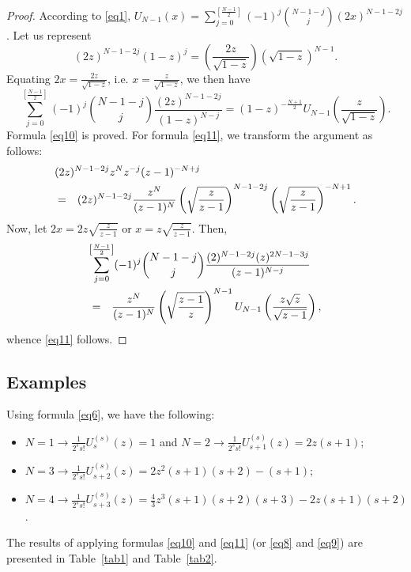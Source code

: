 \documentclass{article}
\begin{document}
\begin{proof}
According to \eqref{eq1}, $\displaystyle U_{N-1}(x) = \sum_{j = 0}^{\left[\frac{N-1}{2}\right]}(-1)^j{N-1-j \choose j}(2x)^{N-1-2j}$. Let us represent
$$
(2z)^{N-1-2j}(1-z)^j = \left(\frac{2z}{\sqrt{1-z}}\right)(\sqrt{1-z})^{N-1}.
$$
Equating $2x = \frac{2z}{\sqrt{1-z}}$, i.e. $x = \frac{z}{\sqrt{1-z}}$, we then have
$$
\sum_{j = 0}^{\left[\frac{N-1}{2}\right]}(-1)^j{N-1-j \choose j}\frac{(2z)^{N-1-2j}}{(1-z)^{N-j}} = (1-z)^{-\frac{N+1}{2}}U_{N-1}\left(\frac{z}{\sqrt{1-z}}\right).
$$
Formula \eqref{eq10} is proved. For formula \eqref{eq11}, we transform the argument as follows:
\begin{eqnarray*}
\lefteqn{(2z)^{N-1-2j}z^Nz^{-j}(z-1)^{-N+j}} \\
&=& (2z)^{N-1-2j}\frac{z^N}{(z-1)^N}\left(\sqrt{\frac{z}{z-1}}\right)^{N-1-2j}\left(\sqrt{\frac{z}{z-1}}\right)^{-N+1}.
\end{eqnarray*}
Now, let $\displaystyle 2x = 2z\sqrt{\frac{z}{z-1}}$ or $\displaystyle x = z\sqrt{\frac{z}{z-1}}$. Then,
\begin{eqnarray*}
\lefteqn{\sum_{j = 0}^{\left[\frac{N-1}{2}\right]}(-1)^j{N-1-j \choose j}\frac{(2)^{N-1-2j}(z)^{2N-1-3j}}{(z-1)^{N-j}}} \\
&=& \frac{z^N}{(z - 1)^N}\left(\sqrt{\frac{z - 1}{z}}\right)^{N-1}U_{N-1}\left(\frac{z\sqrt{z}}{\sqrt{z - 1}}\right),
\end{eqnarray*}
whence \eqref{eq11} follows.
\end{proof}

\subsection{Examples}

Using formula \eqref{eq6}, we have the following:
\begin{itemize}
\item $N = 1 \rightarrow \frac{1}{2^s s!}U_{s}^{(s)}(z) = 1$ and $N = 2 \rightarrow \frac{1}{2^s s!}U_{s + 1}^{(s)}(z) = 2z(s + 1)$;
\item $N = 3 \rightarrow \frac{1}{2^s s!}U_{s+2}^{(s)}(z) = 2z^2(s+1)(s + 2) - (s + 1)$;
\item $N = 4 \rightarrow \frac{1}{2^s s!}U_{s+3}^{(s)}(z) = \frac{4}{3}z^3(s + 1)(s + 2)(s + 3) - 2z(s + 1)(s + 2)$.
\end{itemize}

The results of applying formulas \eqref{eq10} and \eqref{eq11} (or \eqref{eq8} and \eqref{eq9}) are presented in Table~\ref{tab1} and Table~\ref{tab2}.
\end{document}
